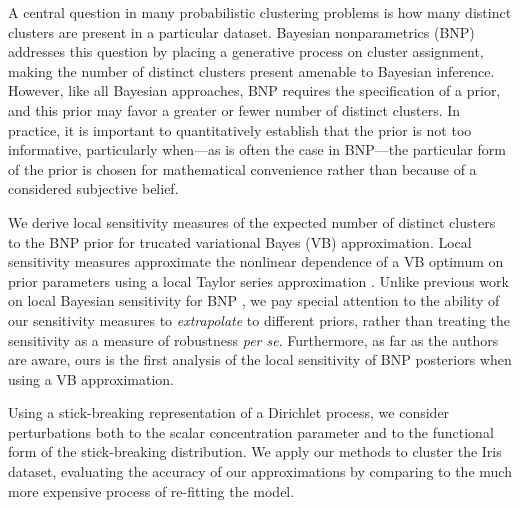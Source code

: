 
A central question in many probabilistic clustering problems is how many
distinct clusters are present in a particular dataset.
Bayesian nonparametrics (BNP) addresses this question by placing a generative
process on cluster assignment, making the number of distinct clusters present
amenable to Bayesian inference.  However, like all Bayesian approaches, BNP
requires the specification of a prior, and this prior may favor a greater or
fewer number of distinct clusters.
In practice, it is important to quantitatively establish that the prior is
not too informative, particularly when---as is often the case in BNP---the
particular form of the prior is chosen for mathematical convenience rather than
because of a considered subjective belief.

We derive local sensitivity measures of the expected number of distinct clusters
to the BNP prior for trucated variational Bayes (VB) approximation.  Local
sensitivity measures approximate the nonlinear dependence of a VB optimum on
prior parameters using a local Taylor series approximation
\citep{gustafson:1996:localposterior, giordano:2017:covariances}. Unlike
previous work on local Bayesian sensitivity for BNP
\citep{Basu:2000:BNP_robustness}, we pay special attention to the ability of our
sensitivity measures to \emph{extrapolate} to different priors, rather than
treating the sensitivity as a measure of robustness \textit{per se}.
Furthermore, as far as the authors are aware, ours is the first analysis of the
local sensitivity of BNP posteriors when using a VB approximation.

Using a stick-breaking representation of a Dirichlet process, we consider
perturbations both to the scalar concentration parameter and to the functional
form of the stick-breaking distribution. We apply our methods to cluster the
Iris \citep{iris_data_anderson, iris_data_fisher} dataset, evaluating the
accuracy of our approximations by comparing to the much more expensive process
of re-fitting the model.
